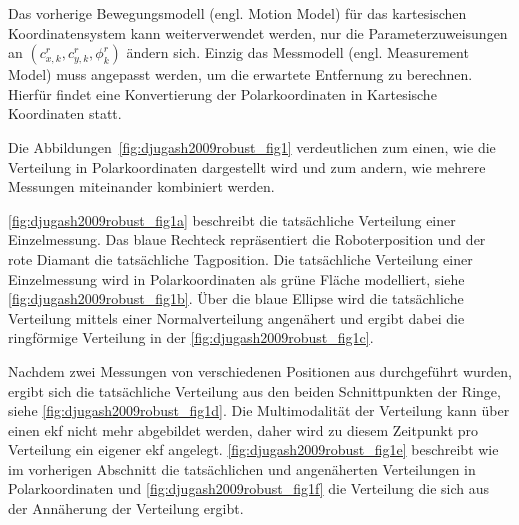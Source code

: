 Das vorherige Bewegungsmodell (engl. Motion Model) für das kartesischen Koordinatensystem kann weiterverwendet werden, nur die Parameterzuweisungen an $\left( c_{x,k}^r, c_{y,k}^r, \phi_k^r \right)$ ändern sich. Einzig das Messmodell (engl. Measurement Model) muss angepasst werden, um die erwartete Entfernung zu berechnen. Hierfür findet eine Konvertierung der Polarkoordinaten in Kartesische Koordinaten statt.

Die Abbildungen~\ref{fig:djugash2009robust_fig1} verdeutlichen zum einen, wie die Verteilung in Polarkoordinaten dargestellt wird und zum andern, wie mehrere Messungen miteinander kombiniert werden.

\autoref{fig:djugash2009robust_fig1a} beschreibt die tatsächliche Verteilung einer Einzelmessung. Das blaue Rechteck repräsentiert die Roboterposition und der rote Diamant die tatsächliche Tagposition. Die tatsächliche Verteilung einer Einzelmessung wird in Polarkoordinaten als grüne Fläche modelliert, siehe \autoref{fig:djugash2009robust_fig1b}. Über die blaue Ellipse wird die tatsächliche Verteilung mittels einer Normalverteilung angenähert und ergibt dabei die ringförmige Verteilung in der \autoref{fig:djugash2009robust_fig1c}.

Nachdem zwei Messungen von verschiedenen Positionen aus durchgeführt wurden, ergibt sich die tatsächliche Verteilung aus den beiden Schnittpunkten der Ringe, siehe \mbox{\autoref{fig:djugash2009robust_fig1d}}. Die Multimodalität der Verteilung kann über einen \Gls{ekf} nicht mehr abgebildet werden, daher wird zu diesem Zeitpunkt pro Verteilung ein eigener \Gls{ekf} angelegt. \autoref{fig:djugash2009robust_fig1e} beschreibt wie im vorherigen Abschnitt die tatsächlichen und angenäherten Verteilungen in Polarkoordinaten und \autoref{fig:djugash2009robust_fig1f} die Verteilung die sich aus der Annäherung der Verteilung ergibt.


